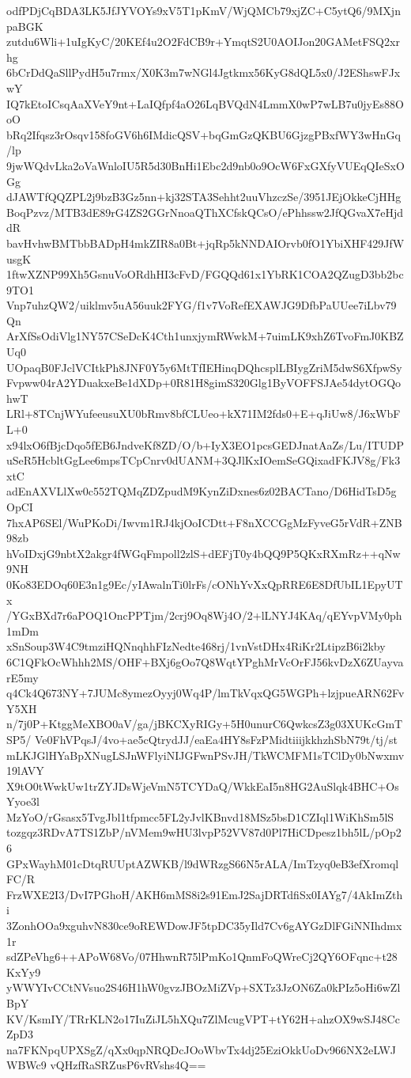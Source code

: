 odfPDjCqBDA3LK5JfJYVOYs9xV5T1pKmV/WjQMCb79xjZC+C5ytQ6/9MXjnpaBGK
zutdu6Wli+1uIgKyC/20KEf4u2O2FdCB9r+YmqtS2U0AOIJon20GAMetFSQ2xrhg
6bCrDdQaSllPydH5u7rmx/X0K3m7wNGl4Jgtkmx56KyG8dQL5x0/J2EShswFJxwY
IQ7kEtoICsqAaXVeY9nt+LaIQfpf4aO26LqBVQdN4LmmX0wP7wLB7u0jyEs88OoO
bRq2Ifqsz3rOsqv158foGV6h6IMdicQSV+bqGmGzQKBU6GjzgPBxfWY3wHnGq/lp
9jwWQdvLka2oVaWnloIU5R5d30BnHi1Ebc2d9nb0o9OcW6FxGXfyVUEqQIeSxOGg
dJAWTfQQZPL2j9bzB3Gz5nn+kj32STA3Sehht2uuVhzczSe/3951JEjOkkeCjHHg
BoqPzvz/MTB3dE89rG4ZS2GGrNnoaQThXCfskQCsO/ePhhssw2JfQGvaX7eHjddR
bavHvhwBMTbbBADpH4mkZIR8a0Bt+jqRp5kNNDAIOrvb0fO1YbiXHF429JfWusgK
1ftwXZNP99Xh5GsnuVoORdhHI3cFvD/FGQQd61x1YbRK1COA2QZugD3bb2bc9TO1
Vnp7uhzQW2/uiklmv5uA56uuk2FYG/f1v7VoRefEXAWJG9DfbPaUUee7iLbv79Qn
ArXfSsOdiVlg1NY57CSeDcK4Cth1unxjymRWwkM+7uimLK9xhZ6TvoFmJ0KBZUq0
UOpaqB0FJclVCItkPh8JNF0Y5y6MtTfIEHinqDQhcsplLBIygZriM5dwS6XfpwSy
Fvpww04rA2YDuakxeBe1dXDp+0R81H8gimS320Glg1ByVOFFSJAe54dytOGQohwT
LRl+8TCnjWYufeeusuXU0bRmv8bfCLUeo+kX71IM2fds0+E+qJiUw8/J6xWbFL+0
x94lxO6fBjcDqo5fEB6JndveKf8ZD/O/b+IyX3EO1pcsGEDJnatAaZs/Lu/ITUDP
uSeR5HcbltGgLee6mpsTCpCnrv0dUANM+3QJlKxIOemSeGQixadFKJV8g/Fk3xtC
adEnAXVLlXw0c552TQMqZDZpudM9KynZiDxnes6z02BACTano/D6HidTsD5gOpCI
7hxAP6SEl/WuPKoDi/Iwvm1RJ4kjOoICDtt+F8nXCCGgMzFyveG5rVdR+ZNB98zb
hVoIDxjG9nbtX2akgr4fWGqFmpoll2zlS+dEFjT0y4bQQ9P5QKxRXmRz++qNw9NH
0Ko83EDOq60E3n1g9Ec/yIAwalnTi0lrFs/cONhYvXxQpRRE6E8DfUbIL1EpyUTx
/YGxBXd7r6aPOQ1OncPPTjm/2crj9Oq8Wj4O/2+lLNYJ4KAq/qEYvpVMy0ph1mDm
xSnSoup3W4C9tmziHQNnqhhFIzNedte468rj/1vnVstDHx4RiKr2LtipzB6i2kby
6C1QFkOcWhhh2MS/OHF+BXj6gOo7Q8WqtYPghMrVcOrFJ56kvDzX6ZUayvarE5my
q4Ck4Q673NY+7JUMc8ymezOyyj0Wq4P/lmTkVqxQG5WGPh+lzjpueARN62FvY5XH
n/7j0P+KtggMeXBO0aV/ga/jBKCXyRIGy+5H0unurC6QwkcsZ3g03XUKcGmTSP5/
Ve0FhVPqsJ/4vo+ae5cQtrydJJ/eaEa4HY8sFzPMidtiiijkkhzhSbN79t/tj/st
mLKJGlHYaBpXNugLSJnWFlyiNIJGFwnPSvJH/TkWCMFM1sTClDy0bNwxmv19lAVY
X9tO0tWwkUw1trZYJDsWjeVmN5TCYDaQ/WkkEaI5n8HG2AuSlqk4BHC+OsYyoe3l
MzYoO/rGsasx5TvgJbl1tfpmcc5FL2yJvlKBnvd18MSz5bsD1CZIql1WiKhSm5lS
tozgqz3RDvA7TS1ZbP/nVMem9wHU3lvpP52VV87d0Pl7HiCDpesz1bh5lL/pOp26
GPxWayhM01cDtqRUUptAZWKB/l9dWRzgS66N5rALA/ImTzyq0eB3efXromqlFC/R
FrzWXE2I3/DvI7PGhoH/AKH6mMS8i2s91EmJ2SajDRTdfiSx0IAYg7/4AkImZthi
3ZonhOOa9xguhvN830ce9oREWDowJF5tpDC35yIld7Cv6gAYGzDlFGiNNIhdmx1r
sdZPeVhg6++APoW68Vo/07HhwnR75lPmKo1QnmFoQWreCj2QY6OFqnc+t28KxYy9
yWWYIvCCtNVsuo2S46H1hW0gvzJBOzMiZVp+SXTz3JzON6Za0kPIz5oHi6wZlBpY
KV/KsmIY/TRrKLN2o17IuZiJL5hXQu7ZlMcugVPT+tY62H+ahzOX9wSJ48CcZpD3
na7FKNpqUPXSgZ/qXx0qpNRQDcJOoWbvTx4dj25EziOkkUoDv966NX2eLWJWBWc9
vQHzfRaSRZusP6vRVshs4Q==
